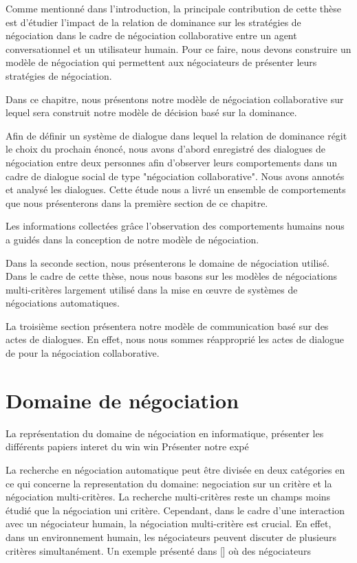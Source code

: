 
Comme mentionné dans l'introduction, la principale contribution de cette thèse est d'étudier l'impact de la relation de dominance sur les stratégies de négociation dans le cadre de négociation collaborative entre un agent conversationnel et un utilisateur humain. 
Pour ce faire, nous devons construire un modèle de négociation qui permettent aux négociateurs de présenter leurs stratégies de négociation. 

Dans ce chapitre, nous présentons notre modèle de négociation collaborative sur lequel sera construit notre modèle de décision basé sur la dominance. 

Afin de définir un système de dialogue dans lequel la relation de dominance régit le choix du prochain énoncé, nous avons d'abord enregistré des dialogues de négociation entre deux personnes afin d'observer leurs comportements dans un cadre de dialogue social de type "négociation collaborative". Nous avons annotés et analysé les dialogues. Cette étude nous a livré un ensemble de comportements  que nous présenterons dans la première section de ce chapitre. 

Les informations collectées grâce l'observation des comportements humains nous a guidés dans la conception de notre modèle de négociation.



Dans la seconde section, nous présenterons le domaine de négociation utilisé. Dans le cadre de cette thèse, nous nous basons sur les modèles de négociations multi-critères largement utilisé dans la mise en œuvre de systèmes de négociations automatiques. 

La troisième section présentera notre modèle de communication basé sur des actes de dialogues. En effet, nous nous sommes réapproprié les actes de dialogue de \cite{sidner} pour la négociation collaborative.

\section{Domaine de négociation}

	La représentation du domaine de négociation en  informatique, présenter les différents papiers
	interet du win win
	Présenter notre expé
	
	
	La recherche en négociation automatique peut être divisée en deux catégories en ce qui concerne la representation du domaine: negociation sur un critère et la négociation multi-critères. La recherche multi-critères reste un champs moins étudié que la négociation uni critère. Cependant, dans le cadre d'une interaction avec un négociateur humain, la négociation multi-critère est crucial. En effet, dans un environnement humain, les négociateurs peuvent discuter de plusieurs critères simultanément. Un exemple présenté dans [] où des négociateurs
	

